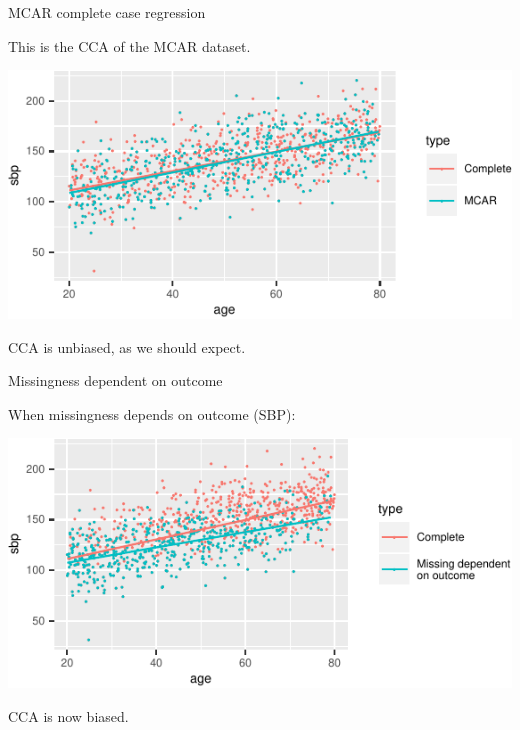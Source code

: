\documentclass[ignorenonframetext,]{beamer}
\begin{document}
\begin{frame}{MCAR complete case regression}
\protect\hypertarget{mcar-complete-case-regression}{}

This is the CCA of the MCAR dataset.

\begin{center}\includegraphics{Lecture2_files/figure-beamer/unnamed-chunk-10-1} \end{center}

CCA is unbiased, as we should expect.

\end{frame}

\begin{frame}{Missingness dependent on outcome}
\protect\hypertarget{missingness-dependent-on-outcome}{}

When missingness depends on outcome (SBP):

\begin{center}\includegraphics{Lecture2_files/figure-beamer/unnamed-chunk-11-1} \end{center}

CCA is now biased.

\end{frame}
\end{document}
